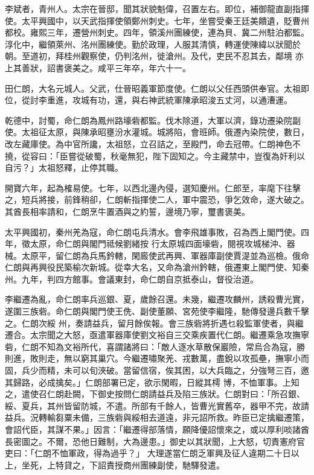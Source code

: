 \begin{pinyinscope}
 李斌者，青州人。太宗在晉邸，聞其狀貌魁偉，召置左右。即位，補御龍直副指揮使。太平興國中，以天武指揮使領鄭州刺史。七年，坐嘗受秦王廷美饋遺，貶曹州都校。雍熙三年，遷營州刺史。四年，領溪州團練使，連為貝、冀二州駐泊都監。淳化中，繼領萊州、洺州團練使。勤於政理，人服其清慎，轉運使陳緯以狀聞於朝。至道初，拜桂州觀察使，仍判洺州，徙滄州。及代，吏民不忍其去，鄰境
 亦上其善狀，詔書褒美之。咸平三年卒，年六十一。



 田仁朗，大名元城人。父武，仕晉昭義軍節度使。仁朗以父任西頭供奉官。太祖即位，從討李重進，攻城有功，還，與右神武統軍陳承昭浚五丈河，以通漕運。



 乾德中，討蜀，命仁朗為鳳州路壕砦都監。伐木除道，大軍以濟，錄功遷染院副使。太祖征太原，與陳承昭壅汾水灌城。城將陷，會班師。俄遷內染院使，數日，改左藏庫使。為中官所讒，太祖怒，立召詰之，至殿門，命去冠帶。仁朗神色不
 撓，從容曰：「臣嘗從破蜀，秋毫無犯，陛下固知之。今主藏禁中，豈復為奸利以自污？」太祖怒釋，止停其職。



 開寶六年，起為榷易使。七年，以西北邊內侵，選知慶州。仁郎至，率麾下往擊之，短兵將接，前鋒稍卻，仁朗斬指揮使二人，軍中震恐，爭乞效命，遂大破之。其酋長相率請和，仁朗烹牛置酒與之約誓，邊境乃寧，璽書褒美。



 太平興國初，秦州羌為寇，命仁朗屯兵清水。會李飛雄事敗，召為西上閣門使。四年，徵太原，命仁朗與閣門祗候劉緒按
 行太原城四面壕砦，閱視攻城梯沖、器械。太原平，留仁朗為兵馬鈐轄，閑廄使武再興、軍器庫副使賈湜並為巡檢。俄命仁朗與再興役民築榆次新城。從幸大名，又命為滄州鈐轄，俄遷東上閣門使、知秦州。九年，判四方館事。會議東封，命仁朗自京抵泰山，督役治道。



 李繼遷為亂，命仁朗率兵巡銀、夏，歲餘召還。未幾，繼遷攻麟州，誘殺曹光實，遂圍三族砦。命仁朗與閣門使王侁、副使董願、宮苑使李繼隆，馳傳發邊兵數千擊之。仁朗次綏
 州，奏請益兵，留月餘俟報。會三族砦將折遇乜殺監軍使者，與繼遷合。太宗聞之大怒，亟遣軍器庫使劉文裕自三交乘疾置代仁朗。繼遷乘急攻撫寧砦，仁朗不知為文裕所代，喜謂諸將曰：「敵人逐水草散保巖險，常烏合為寇，勝則進，敗則走，無以窮其巢穴。今繼遷嘯聚羌、戎數萬，盡銳以攻孤壘，撫寧小而固，兵少而精，未可以旬浹破。當留信宿，俟其困，以大兵臨之，分強弩三百，邀其歸路，必成擒矣。」仁朗部署已定，欲示閑暇，日縱其樗
 博，不恤軍事。上知之，遣使召仁朗赴闕，下御史按問仁朗請益兵及陷三族狀。仁朗對曰：「所召銀、綏、夏兵，其州皆留防城，不遣。所部有千餘人，皆曹光實舊卒，器甲不完，故請益兵。況轉輸芻粟未備，三族砦與綏相去道遠，非元詔所救。昨臣已定擒繼遷策，會詔代臣，其謀不果。」因言：「繼遷得部落情，願降優詔懷來之，或以厚利啖諸酋長密圖之。不爾，恐他日難制，大為邊患。」御史以其狀聞，上大怒，切責憲府官吏曰：「仁朗不恤軍政，得為過乎？」
 大理遂當仁朗乏軍興及征人違期二十日以上，坐死，上特貸之，下詔責授商州團練副使，馳驛發遣。




\end{pinyinscope}

